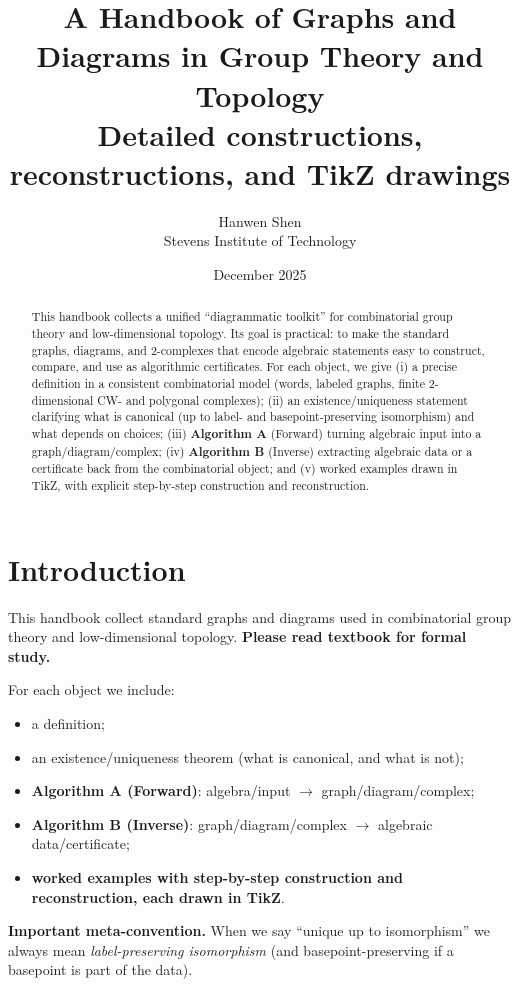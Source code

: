 \documentclass[11pt]{article}
\title{A Handbook of Graphs and Diagrams in Group Theory and Topology\\
\large Detailed constructions, reconstructions, and TikZ drawings}
\author{Hanwen Shen\\ Stevens Institute of Technology}
\date{December 2025}
\theoremstyle{definition}
\theoremstyle{plain}
\theoremstyle{remark}
\begin{document}
\maketitle
\begin{abstract}
This handbook collects a unified “diagrammatic toolkit” for combinatorial group theory and low-dimensional topology.
Its goal is practical: to make the standard graphs, diagrams, and 2-complexes that encode algebraic statements
easy to construct, compare, and use as algorithmic certificates.
For each object, we give (i) a precise definition in a consistent combinatorial model (words, labeled graphs, finite
2-dimensional CW- and polygonal complexes); (ii) an existence/uniqueness statement clarifying what is canonical
(up to label- and basepoint-preserving isomorphism) and what depends on choices; (iii) \textbf{Algorithm A} (Forward)
turning algebraic input into a graph/diagram/complex; (iv) \textbf{Algorithm B} (Inverse) extracting algebraic data or a
certificate back from the combinatorial object; and (v) worked examples drawn in TikZ, with explicit step-by-step
construction and reconstruction.
\end{abstract}
\tableofcontents

\section{Introduction}
This handbook collect standard graphs and diagrams used in combinatorial group theory and low-dimensional topology. \textbf{Please read textbook for formal study.}

For each object we include:
\begin{itemize}[leftmargin=2em]
\item a definition;
\item an existence/uniqueness theorem (what is canonical, and what is not);
\item \textbf{Algorithm A (Forward)}: algebra/input $\to$ graph/diagram/complex;
\item \textbf{Algorithm B (Inverse)}: graph/diagram/complex $\to$ algebraic data/certificate;
\item \textbf{worked examples with step-by-step construction and reconstruction, each drawn in TikZ}.
\end{itemize}

\medskip
\noindent\textbf{Important meta-convention.}
When we say ``unique up to isomorphism'' we always mean \emph{label-preserving isomorphism} (and basepoint-preserving if a basepoint is part of the data).
\end{document}
